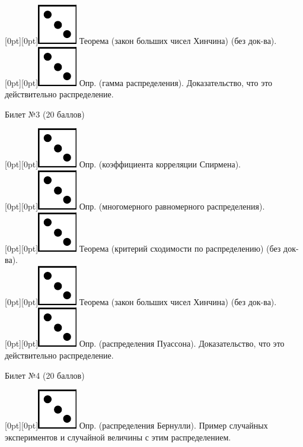 \documentclass[preview]{standalone}
\begin{document}
\raisebox{-1pt}[0pt][0pt]{\includegraphics[width=0.02\linewidth]{3.png}} Теорема (закон больших чисел Хинчина) (без док-ва). \\
\raisebox{-1pt}[0pt][0pt]{\includegraphics[width=0.02\linewidth]{3.png}} Опр. (гамма распределения). Доказательство, что это действительно распределение. \\
\begin{center} {\Large Билет №3 (20 баллов)} \end{center}
\raisebox{-1pt}[0pt][0pt]{\includegraphics[width=0.02\linewidth]{3.png}} Опр. (коэффициента корреляции Спирмена). \\
\raisebox{-1pt}[0pt][0pt]{\includegraphics[width=0.02\linewidth]{3.png}} Опр. (многомерного равномерного распределения). \\
\raisebox{-1pt}[0pt][0pt]{\includegraphics[width=0.02\linewidth]{3.png}} Теорема (критерий сходимости по распределению) (без док-ва). \\
\raisebox{-1pt}[0pt][0pt]{\includegraphics[width=0.02\linewidth]{3.png}} Теорема (закон больших чисел Хинчина) (без док-ва). \\
\raisebox{-1pt}[0pt][0pt]{\includegraphics[width=0.02\linewidth]{3.png}}  Опр. (распределения Пуассона). Доказательство, что это действительно распределение. \\
\begin{center} {\Large Билет №4 (20 баллов)} \end{center}
\raisebox{-1pt}[0pt][0pt]{\includegraphics[width=0.02\linewidth]{3.png}} Опр. (распределения Бернулли).  Пример случайных экспериментов и случайной величины с этим распределением. \\
\end{document}
